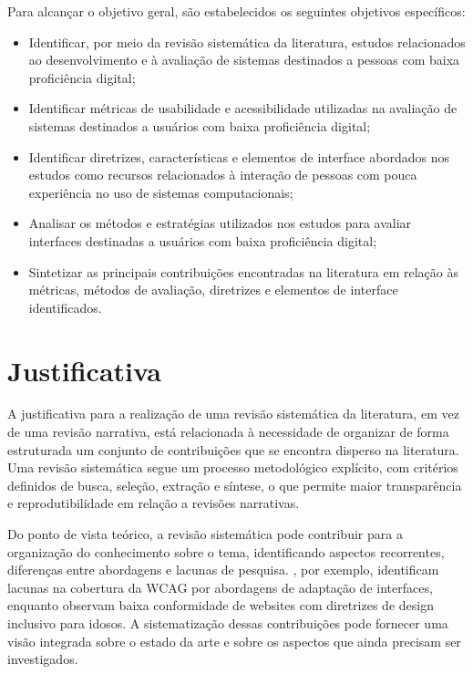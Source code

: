 Para alcançar o objetivo geral, são estabelecidos os seguintes objetivos específicos:

\begin{itemize}

    \item Identificar, por meio da revisão sistemática da literatura, estudos relacionados ao desenvolvimento e à avaliação de sistemas destinados a pessoas com baixa proficiência digital;

    \item Identificar métricas de usabilidade e acessibilidade utilizadas na avaliação de sistemas destinados a usuários com baixa proficiência digital;

    \item Identificar diretrizes, características e elementos de interface abordados nos estudos como recursos relacionados à interação de pessoas com pouca experiência no uso de sistemas computacionais;

    \item Analisar os métodos e estratégias utilizados nos estudos para avaliar interfaces destinadas a usuários com baixa proficiência digital;

    \item Sintetizar as principais contribuições encontradas na literatura em relação às métricas, métodos de avaliação, diretrizes e elementos de interface identificados.

\end{itemize}

\section{Justificativa}

A justificativa para a realização de uma revisão sistemática da literatura, em vez de uma revisão narrativa, está relacionada à necessidade de organizar de forma estruturada um conjunto de contribuições que se encontra disperso na literatura. Uma revisão sistemática segue um processo metodológico explícito, com critérios definidos de busca, seleção, extração e síntese, o que permite maior transparência e reprodutibilidade em relação a revisões narrativas.

Do ponto de vista teórico, a revisão sistemática pode contribuir para a organização do conhecimento sobre o tema, identificando aspectos recorrentes, diferenças entre abordagens e lacunas de pesquisa. \cite{wickramathilaka2023addressing}, por exemplo, identificam lacunas na cobertura da WCAG por abordagens de adaptação de interfaces, enquanto \cite{dombrovskaia2021guideline} observam baixa conformidade de websites com diretrizes de design inclusivo para idosos. A sistematização dessas contribuições pode fornecer uma visão integrada sobre o estado da arte e sobre os aspectos que ainda precisam ser investigados.

